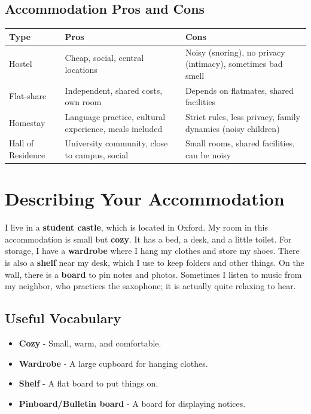 \subsection{Accommodation Pros and Cons}

\begin{table}[h]
\centering
\begin{tabular}{|l|p{4cm}|p{4cm}|}
\hline
\textbf{Type} & \textbf{Pros} & \textbf{Cons} \\
\hline
Hostel & Cheap, social, central locations & Noisy (snoring), no privacy (intimacy), sometimes bad smell \\
\hline
Flat-share & Independent, shared costs, own room & Depends on flatmates, shared facilities \\
\hline
Homestay & Language practice, cultural experience, meals included & Strict rules, less privacy, family dynamics (noisy children) \\
\hline
Hall of Residence & University community, close to campus, social & Small rooms, shared facilities, can be noisy \\
\hline
\end{tabular}
\end{table}

\section{Describing Your Accommodation}

\begin{readingbox}[title=Sample Description: My Student Room]
I live in a \textbf{student castle}, which is located in Oxford. My room in this accommodation is small but \textbf{cozy}. It has a bed, a desk, and a little toilet.
For storage, I have a \textbf{wardrobe} where I hang my clothes and store my shoes. There is also a \textbf{shelf} near my desk, which I use to keep folders and other things. On the wall, there is a \textbf{board} to pin notes and photos.
Sometimes I listen to music from my neighbor, who practices the saxophone; it is actually quite relaxing to hear.
\end{readingbox}

\subsection{Useful Vocabulary}
\begin{itemize}
    \item \textbf{Cozy} - Small, warm, and comfortable.
    \item \textbf{Wardrobe} - A large cupboard for hanging clothes.
    \item \textbf{Shelf} - A flat board to put things on.
    \item \textbf{Pinboard/Bulletin board} - A board for displaying notices.
\end{itemize}

